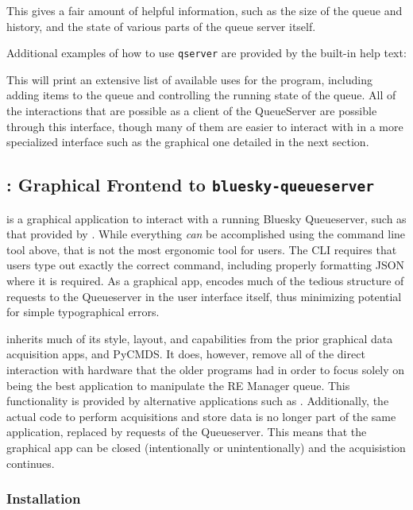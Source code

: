 This gives a fair amount of helpful information, such as the size of the queue and history, and the state of various parts of the queue server itself.

Additional examples of how to use \texttt{qserver} are provided by the built-in help text:


This will print an extensive list of available uses for the program, including adding items to the queue and controlling the running state of the queue.
All of the interactions that are possible as a client of the QueueServer are possible through this interface, though many of them are easier to interact with in a more specialized interface such as the graphical one detailed in the next section.

\subsection{\blueskycmds: Graphical Frontend to \texttt{bluesky-queueserver}}

\blueskycmds is a graphical application to interact with a running Bluesky Queueserver, such as that provided by \biab.
While everything \textit{can} be accomplished using the command line tool above, that is not the most ergonomic tool for users.
The CLI requires that users type out exactly the correct command, including properly formatting JSON where it is required.
As a graphical app, \blueskycmds encodes much of the tedious structure of requests to the Queueserver in the user interface itself, thus minimizing potential for simple typographical errors.

\blueskycmds inherits much of its style, layout, and capabilities from the prior graphical data acquisition apps, \yaqccmds and PyCMDS.
It does, however, remove all of the direct interaction with hardware that the older programs had in order to focus solely on being the best application to manipulate the RE Manager queue.
This functionality is provided by alternative applications such as \yaqcqtpy.
Additionally, the actual code to perform acquisitions and store data is no longer part of the same application, replaced by requests of the Queueserver.
This means that the graphical app can be closed (intentionally or unintentionally) and the acquisistion continues.

\subsubsection{Installation}


